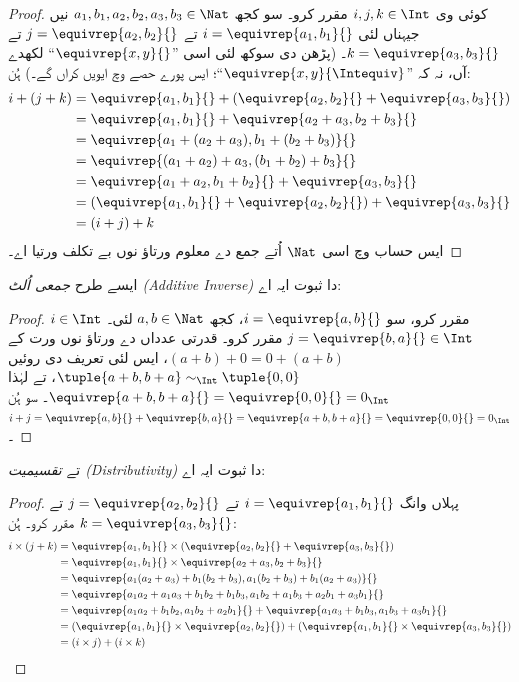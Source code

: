 \documentclass[../../../include/open-logic-section]{subfiles}
\begin{document}
\begin{proof}
کوئی وی $i, j, k \in \Int$ مقرر کرو۔ سو کجھ $a_1, b_1, a_2, b_2, a_3, b_3 \in
\Nat$ نیں جیہناں لئی $i = \equivrep{a_1, b_1}{}$ تے $j =
\equivrep{a_2,b_2}{}$ تے $k = \equivrep{a_3, b_3}{}$۔ (پڑھن دی
سوکھ لئی اسی ”$\equivrep{x, y}{}$“ لکھدے آں، نہ کہ
”$\equivrep{x, y}{\Intequiv}$“؛ ایس پورے حصے وچ ایویں کراں گے۔) ہُن:
\begin{align*}
	i + (j + k) &= \equivrep{a_1, b_1}{}+(\equivrep{a_2, b_2}{} + \equivrep{a_3, b_3}{}) \\
	&= \equivrep{a_1,  b_1}{} + \equivrep{a_2+a_3, b_2+b_3}{}\\
	&= \equivrep{a_1 + (a_2 + a_3), b_1 + (b_2 + b_3)}{}\\
	&= \equivrep{(a_1 + a_2) + a_3, (b_1 + b_2) + b_3}{}\\
	&= \equivrep{a_1 + a_2, b_1 + b_2}{} + \equivrep{a_3, b_3}{}\\
	&= (\equivrep{a_1, b_1}{} + \equivrep{a_2, b_2}{}) + \equivrep{a_3, b_3}{}\\
	&= (i+j) + k
\end{align*}
ایس حساب وچ اسی $\Nat$ اُتے جمع دے معلوم ورتاؤ نوں بے تکلف ورتیا اے۔
\end{proof}

ایسے طرح \emph{جمعی اُلٹ (Additive Inverse)} دا ثبوت ایہ اے:

\begin{proof}
$i \in \Int$ مقرر کرو، سو $i = \equivrep{a,b}{}$، کجھ $a,b \in
\Nat$ لئی۔ $j = \equivrep{b,a}{} \in \Int$ مقرر کرو۔
قدرتی عدداں دے ورتاؤ نوں ورت کے $(a+b) + 0 = 0 + (a+b)$، ایس لئی
تعریف دی روئیں $\tuple{a+b, b+a} \sim_\Int \tuple{0,0}$، تے لہٰذا
$\equivrep{a+b, b+a}{} = \equivrep{0, 0}{} = 0_\Int$۔ سو ہُن $i + j =
\equivrep{a,b}{}+\equivrep{b,a}{}=\equivrep{a+b, b+a}{}= \equivrep{0,
0}{} = 0_\Int$۔
\end{proof}

تے \emph{تقسیمیت (Distributivity)} دا ثبوت ایہ اے:

\begin{proof}
پہلاں وانگ $i = \equivrep{a_1, b_1}{}$ تے $j =
\equivrep{a_2,b_2}{}$ تے $k = \equivrep{a_3, b_3}{}$ مقرر کرو۔ ہُن:
\begin{align*}
	i \times (j + k)
	&= \equivrep{a_1, b_1}{} \times (\equivrep{a_2,b_2}{} + \equivrep{a_3, b_3}{})\\
	&= \equivrep{a_1, b_1}{} \times \equivrep{a_2 + a_3,b_2+b_3}{}\\
	&= \equivrep{a_1  (a_2 + a_3) + b_1  (b_2+b_3), a_1  (b_2 + b_3) + b_1 (a_2 + a_3)}{}\\
	&= \equivrep{a_1 a_2 + a_1a_3 + b_1 b_2+b_1b_3, a_1 b_2 + a_1b_3 + a_2b_1 + a_3b_1}{}\\
	&= \equivrep{a_1a_2 + b_1b_2, a_1b_2 + a_2b_1}{} + \equivrep{a_1a_3 + b_1b_3, a_1b_3 + a_3b_1}{}\\
	&= (\equivrep{a_1, b_1}{} \times \equivrep{a_2,b_2}{}) + (\equivrep{a_1, b_1}{} \times  \equivrep{a_3, b_3}{})\\
	&= (i \times j) + (i \times k)
\end{align*}
\end{proof}
\end{document}
